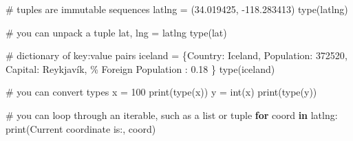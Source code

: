 \documentclass[
  letterpaper,
  DIV=11,
  numbers=noendperiod]{scrreprt}
\newenvironment{Shaded}{\begin{snugshade}}{\end{snugshade}}
\newcommand{\BuiltInTok}[1]{\textcolor[rgb]{0.00,0.23,0.31}{#1}}
\newcommand{\CommentTok}[1]{\textcolor[rgb]{0.37,0.37,0.37}{#1}}
\newcommand{\ControlFlowTok}[1]{\textcolor[rgb]{0.00,0.23,0.31}{\textbf{#1}}}
\newcommand{\DecValTok}[1]{\textcolor[rgb]{0.68,0.00,0.00}{#1}}
\newcommand{\FloatTok}[1]{\textcolor[rgb]{0.68,0.00,0.00}{#1}}
\newcommand{\KeywordTok}[1]{\textcolor[rgb]{0.00,0.23,0.31}{\textbf{#1}}}
\newcommand{\NormalTok}[1]{\textcolor[rgb]{0.00,0.23,0.31}{#1}}
\newcommand{\OperatorTok}[1]{\textcolor[rgb]{0.37,0.37,0.37}{#1}}
\newcommand{\SpecialCharTok}[1]{\textcolor[rgb]{0.37,0.37,0.37}{#1}}
\newcommand{\StringTok}[1]{\textcolor[rgb]{0.13,0.47,0.30}{#1}}
\begin{document}
\begin{Shaded}
\begin{Highlighting}[]
\CommentTok{\# tuples are immutable sequences}
\NormalTok{latlng }\OperatorTok{=}\NormalTok{ (}\FloatTok{34.019425}\NormalTok{, }\OperatorTok{{-}}\FloatTok{118.283413}\NormalTok{)}
\BuiltInTok{type}\NormalTok{(latlng)}
\end{Highlighting}
\end{Shaded}

\begin{Shaded}
\begin{Highlighting}[]
\CommentTok{\# you can unpack a tuple}
\NormalTok{lat, lng }\OperatorTok{=}\NormalTok{ latlng}
\BuiltInTok{type}\NormalTok{(lat)}
\end{Highlighting}
\end{Shaded}

\begin{Shaded}
\begin{Highlighting}[]
\CommentTok{\# dictionary of key:value pairs}
\NormalTok{iceland }\OperatorTok{=}\NormalTok{ \{}\StringTok{\textquotesingle{}Country\textquotesingle{}}\NormalTok{: }\StringTok{\textquotesingle{}Iceland\textquotesingle{}}\NormalTok{, }\StringTok{\textquotesingle{}Population\textquotesingle{}}\NormalTok{: }\DecValTok{372520}\NormalTok{, }\StringTok{\textquotesingle{}Capital\textquotesingle{}}\NormalTok{: }\StringTok{\textquotesingle{}Reykjavík\textquotesingle{}}\NormalTok{, }\StringTok{\textquotesingle{}}\SpecialCharTok{\% F}\StringTok{oreign Population\textquotesingle{}}\NormalTok{ : }\FloatTok{0.18}\NormalTok{ \}}
\BuiltInTok{type}\NormalTok{(iceland)}
\end{Highlighting}
\end{Shaded}

\begin{Shaded}
\begin{Highlighting}[]
\CommentTok{\# you can convert types}
\NormalTok{x }\OperatorTok{=} \StringTok{\textquotesingle{}100\textquotesingle{}}
\BuiltInTok{print}\NormalTok{(}\BuiltInTok{type}\NormalTok{(x))}
\NormalTok{y }\OperatorTok{=} \BuiltInTok{int}\NormalTok{(x)}
\BuiltInTok{print}\NormalTok{(}\BuiltInTok{type}\NormalTok{(y))}
\end{Highlighting}
\end{Shaded}

\begin{Shaded}
\begin{Highlighting}[]
\CommentTok{\# you can loop through an iterable, such as a list or tuple}
\ControlFlowTok{for}\NormalTok{ coord }\KeywordTok{in}\NormalTok{ latlng:}
    \BuiltInTok{print}\NormalTok{(}\StringTok{\textquotesingle{}Current coordinate is:\textquotesingle{}}\NormalTok{, coord)}
\end{Highlighting}
\end{Shaded}
\end{document}
